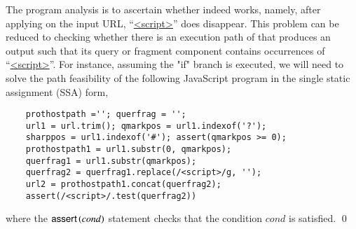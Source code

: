 \begin{example}
The program analysis is to ascertain whether {\urlxsssanitise} indeed works, namely, after applying {\urlxsssanitise} on the input URL, ``\url{<script>}'' does disappear.  This problem can be reduced to checking whether there is an execution path of {\urlxsssanitise} that produces an output such that its query or fragment component contains occurrences of ``\url{<script>}''. For instance, assuming  the "if" branch is executed, %
we will need to solve the path feasibility of the following JavaScript program in the single static assignment (SSA) form,

{\small
\begin{verbatim}
    prothostpath =''; querfrag = '';
    url1 = url.trim(); qmarkpos = url1.indexof('?');
    sharppos = url1.indexof('#'); assert(qmarkpos >= 0); 
    prothostpath1 = url1.substr(0, qmarkpos);
    querfrag1 = url1.substr(qmarkpos);
    querfrag2 = querfrag1.replace(/<script>/g, '');
    url2 = prothostpath1.concat(querfrag2);
    assert(/<script>/.test(querfrag2))
\end{verbatim}
}
where the $\textsf{assert}\left(cond\right)$ statement checks that the condition $cond$ is satisfied. \qed
\end{example}